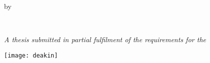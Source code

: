 \vspace*{\fill}
\thispagestyle{empty}
\linespread{1.2}

\centering

\Large
\textbf{\thetitle{}}
\vspace{0.9 cm}

{\normalsize by}
\vspace{0.5 cm}

\theauthor{}\\
\vspace{-0.25 cm}
{\normalsize \theauthorspostnominals{}}
\vspace{0.75 cm}

\vspace{1.5 cm}

\large
\itshape
A thesis submitted in partial fulfilment of the requirements for the\\
\upshape
\thedegree

\vspace{2 cm}
\texttt{[image: deakin]}
\vspace{2 cm}

\upshape
\theinstitution{}

\vspace{1cm}
\thedate{}
\vspace*{\fill}

\justify
\normalsize
\restoregeometry